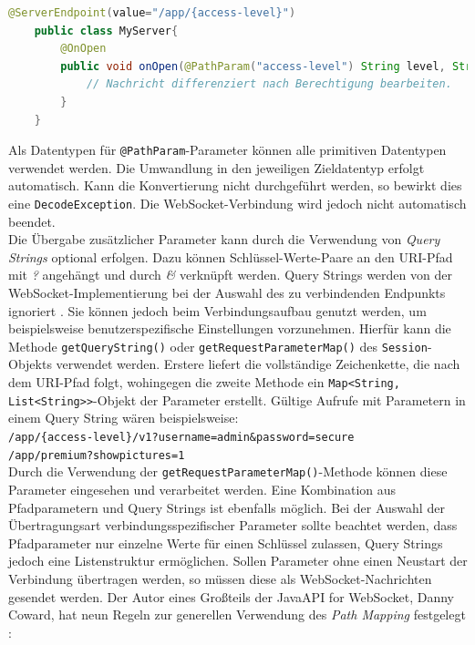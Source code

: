 \documentclass[11pt,a4paper,titlepage]{scrartcl}
\numberwithin{equation}{section}
\begin{document}
\begin{lstlisting}[frame=single, language=Java, caption=Java: PathParam]
	@ServerEndpoint(value="/app/{access-level}")
	public class MyServer{
		@OnOpen
		public void onOpen(@PathParam("access-level") String level, String message) {
			// Nachricht differenziert nach Berechtigung bearbeiten.
		}
	}
\end{lstlisting}

\noindent Als Datentypen für \texttt{@PathParam}-Parameter können alle primitiven Datentypen verwendet werden. Die Umwandlung in den jeweiligen Zieldatentyp erfolgt automatisch. Kann die Konvertierung nicht durchgeführt werden, so bewirkt dies eine \texttt{DecodeException}. Die WebSocket-Verbindung wird jedoch nicht automatisch beendet.\\

\noindent Die Übergabe zusätzlicher Parameter kann durch die Verwendung von \textit{Query Strings} optional erfolgen. Dazu können Schlüssel-Werte-Paare an den URI-Pfad mit \textit{?} angehängt und durch \textit{\&} verknüpft werden. Query Strings werden von der WebSocket-Implementierung bei der Auswahl des zu verbindenden Endpunkts ignoriert \autocite[156]{coward_java_2014}. Sie können jedoch beim Verbindungsaufbau genutzt werden, um beispielsweise benutzerspezifische Einstellungen vorzunehmen. Hierfür kann die Methode \texttt{getQueryString()} oder \texttt{getRequestParameterMap()} des \texttt{Session}-Objekts verwendet werden. Erstere liefert die vollständige Zeichenkette, die nach dem URI-Pfad folgt, wohingegen die zweite Methode ein \texttt{Map<String, List<String>{}>}-Objekt der Parameter erstellt. Gültige Aufrufe mit Parametern in einem Query String wären beispielsweise:\\

\noindent\texttt{/app/\{access-level\}/v1?username=admin\&password=secure}\\
\noindent\texttt{/app/premium?showpictures=1}\\

\noindent Durch die Verwendung der \texttt{getRequestParameterMap()}-Methode können diese Parameter eingesehen und verarbeitet werden. Eine Kombination aus Pfadparametern und Query Strings ist ebenfalls möglich. Bei der Auswahl der Übertragungsart verbindungsspezifischer Parameter sollte beachtet werden, dass Pfadparameter nur einzelne Werte für einen Schlüssel zulassen, Query Strings jedoch eine Listenstruktur ermöglichen. Sollen Parameter ohne einen Neustart der Verbindung übertragen werden, so müssen diese als WebSocket-Nachrichten gesendet werden. Der Autor eines Großteils der Java\texttrademark API for WebSocket, Danny Coward, hat neun Regeln zur generellen Verwendung des \textit{Path Mapping} festgelegt \autocite[146-159]{coward_java_2014}:
\end{document}
